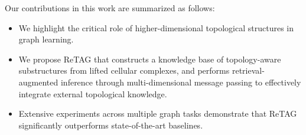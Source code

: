 Our contributions in this work are summarized as follows:
\begin{itemize}
    \item We highlight the critical role of higher-dimensional topological structures in graph learning.%

    \item We propose ReTAG that constructs a knowledge base of topology-aware substructures from lifted cellular complexes, and performs retrieval-augmented inference through multi-dimensional message passing to effectively integrate external topological knowledge.


    \item %
    Extensive experiments across multiple graph tasks demonstrate that ReTAG significantly outperforms state-of-the-art baselines.%
\end{itemize}